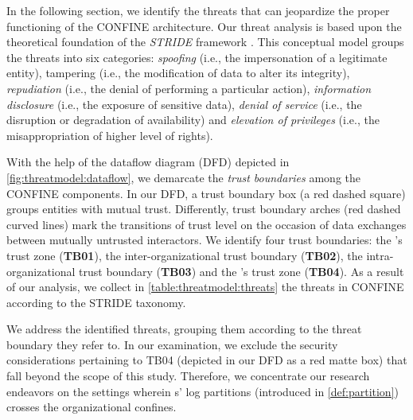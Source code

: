 \begin{newj}
In the following section, we identify the threats that can jeopardize the proper functioning of the CONFINE architecture. Our threat analysis is based upon the theoretical foundation of the \textit{STRIDE} framework \cite{DBLP:journals/re/ScandariatoWJ15}. This conceptual model groups the threats into six categories: \textit{spoofing} (i.e., the impersonation of a legitimate entity), tampering (i.e., the modification of data to alter its integrity), \textit{repudiation} (i.e., the denial of performing a particular action), \textit{information disclosure} (i.e., the exposure of sensitive data), \textit{denial of service} (i.e., the disruption or degradation of availability) and \textit{elevation of privileges} (i.e., the misappropriation of higher level of rights). 

With the help of the dataflow diagram (DFD) depicted in \cref{fig:threatmodel:dataflow}, we demarcate the \textit{trust boundaries} among the CONFINE components. In our DFD, a trust boundary box (a red dashed square) groups entities with mutual trust. Differently, trust boundary arches (red dashed curved lines) mark the transitions of trust level on the occasion of data exchanges between mutually untrusted interactors. We identify four trust boundaries: the 's trust zone (\textbf{TB01}), the inter-organizational trust boundary (\textbf{TB02}), the intra-organizational trust boundary (\textbf{TB03}) and the 's trust zone (\textbf{TB04}). As a result of our analysis, we collect in \cref{table:threatmodel:threats} the threats in CONFINE according to the STRIDE taxonomy.

We address the identified threats, grouping them according to the threat boundary they refer to. In our examination, we exclude the security considerations pertaining to TB04 (depicted in our DFD as a red matte box) that fall beyond the scope of this study. Therefore, we concentrate our research endeavors on the settings wherein s' log partitions (introduced in \cref{def:partition}) crosses the organizational confines. 


\end{newj}
